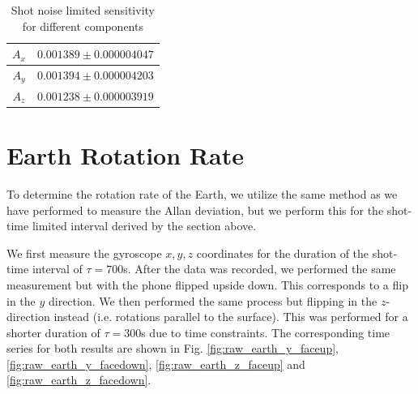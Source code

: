 \documentclass[a4paper]{article}
\begin{document}
\begin{table}
		\centering
\begin{tabular} {|c|c|}
 \hline
 $A_{x}$ & $0.001389 \pm 0.000004047$ \\
 \hline
 $A_{y}$  & $0.001394 \pm 0.000004203 $ \\
 \hline
 $A_{z}$ & $0.001238 \pm 0.000003919$ \\
 \hline
\end{tabular}
\caption{Shot noise limited sensitivity for different components}
\label{tab:A}
\end{table}

\section{Earth Rotation Rate}

To determine the rotation rate of the Earth, we utilize the same method as we have performed to measure the Allan deviation, but we 
perform this for the shot-time limited interval derived by the section above. \par 

We first measure the gyroscope $x, y, z$ coordinates for the duration of the shot-time interval of $\tau = 700$s. After the data was recorded,
we performed the same measurement but with the phone flipped upside down. This corresponds to a flip in the $y$ direction. 
We then performed the same process but flipping in the $z$-direction instead (i.e. rotations parallel to the surface). This was performed for a 
shorter duration of $\tau = 300$s due to time constraints. The corresponding time series for both results are shown in Fig. \ref{fig:raw_earth_y_faceup}, \ref{fig:raw_earth_y_facedown}, \ref{fig:raw_earth_z_faceup} and \ref{fig:raw_earth_z_facedown}.
\end{document}
